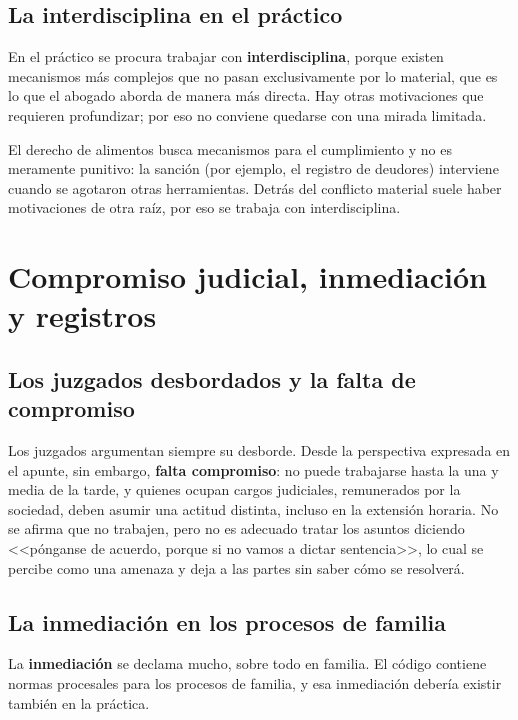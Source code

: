 \documentclass[12pt,oneside]{book}
\begin{document}
\subsection{La interdisciplina en el práctico}

En el práctico se procura trabajar con \textbf{interdisciplina}, porque existen mecanismos más complejos que no pasan exclusivamente por lo material, que es lo que el abogado aborda de manera más directa. Hay otras motivaciones que requieren profundizar; por eso no conviene quedarse con una mirada limitada.

\begin{important}
El derecho de alimentos busca mecanismos para el cumplimiento y no es meramente punitivo: la sanción (por ejemplo, el registro de deudores) interviene cuando se agotaron otras herramientas. Detrás del conflicto material suele haber motivaciones de otra raíz, por eso se trabaja con interdisciplina.
\end{important}

\section{Compromiso judicial, inmediación y registros}

\subsection{Los juzgados desbordados y la falta de compromiso}

Los juzgados argumentan siempre su desborde. Desde la perspectiva expresada en el apunte, sin embargo, \textbf{falta compromiso}: no puede trabajarse hasta la una y media de la tarde, y quienes ocupan cargos judiciales, remunerados por la sociedad, deben asumir una actitud distinta, incluso en la extensión horaria. No se afirma que no trabajen, pero no es adecuado tratar los asuntos diciendo <<pónganse de acuerdo, porque si no vamos a dictar sentencia>>, lo cual se percibe como una amenaza y deja a las partes sin saber cómo se resolverá.

\subsection{La inmediación en los procesos de familia}

La \textbf{inmediación} se declama mucho, sobre todo en familia. El código contiene normas procesales para los procesos de familia, y esa inmediación debería existir también en la práctica.
\end{document}
